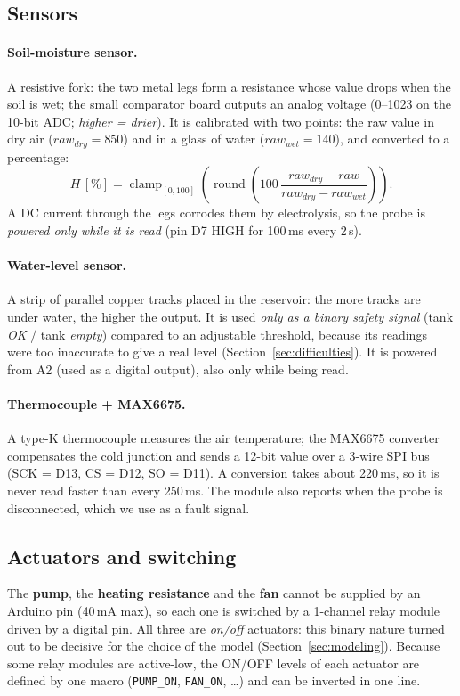 \documentclass[10pt,a4paper,twocolumn]{article}
\newcommand{\code}[1]{\texttt{#1}}
\begin{document}
\subsection{Sensors}
\paragraph{Soil-moisture sensor.} A resistive fork: the two metal legs form a
resistance whose value drops when the soil is wet; the small comparator board outputs
an analog voltage (0--1023 on the 10-bit ADC; \emph{higher = drier}). It is calibrated
with two points: the raw value in dry air ($\mathit{raw}_{dry}=850$) and in a glass of
water ($\mathit{raw}_{wet}=140$), and converted to a percentage:
\begin{equation}
  H\,[\%] = \operatorname{clamp}_{[0,100]}
  \left(\operatorname{round}\!\left(100\,\frac{\mathit{raw}_{dry}-\mathit{raw}}
  {\mathit{raw}_{dry}-\mathit{raw}_{wet}}\right)\right).
  \label{eq:calib}
\end{equation}
A DC current through the legs corrodes them by electrolysis, so the probe is
\emph{powered only while it is read} (pin D7 HIGH for 100\,ms every 2\,s).

\paragraph{Water-level sensor.} A strip of parallel copper tracks placed in the
reservoir: the more tracks are under water, the higher the output. It is used
\emph{only as a binary safety signal} (tank \emph{OK} / tank \emph{empty}) compared to
an adjustable threshold, because its readings were too inaccurate to give a real level
(Section~\ref{sec:difficulties}). It is powered from A2 (used as a digital output),
also only while being read.

\paragraph{Thermocouple + MAX6675.} A type-K thermocouple measures the air temperature;
the MAX6675 converter compensates the cold junction and sends a 12-bit value over a
3-wire SPI bus (SCK = D13, CS = D12, SO = D11). A conversion takes about 220\,ms, so it
is never read faster than every 250\,ms. The module also reports when the probe is
disconnected, which we use as a fault signal.

\subsection{Actuators and switching}
The \textbf{pump}, the \textbf{heating resistance} and the \textbf{fan} cannot be
supplied by an Arduino pin (40\,mA max), so each one is switched by a 1-channel relay
module driven by a digital pin. All three are \emph{on/off} actuators: this binary
nature turned out to be decisive for the choice of the model
(Section~\ref{sec:modeling}). Because some relay modules are active-low, the ON/OFF
levels of each actuator are defined by one macro (\code{PUMP\_ON}, \code{FAN\_ON},
\dots) and can be inverted in one line.
\end{document}
